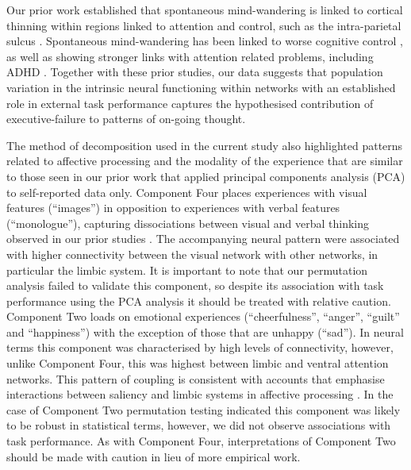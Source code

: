 Our prior work established that spontaneous mind-wandering is linked to cortical thinning within regions linked to attention and control, such as the intra-parietal sulcus \cite{Golchert2017}. 
Spontaneous mind-wandering has been linked to worse cognitive control \cite{Robison2018}, 
as well as showing stronger links with attention related problems, including ADHD \cite{Seli2015}. 
Together with these prior studies, our data suggests that population variation in the intrinsic neural functioning within networks with an established role in external task performance captures the hypothesised contribution of executive-failure to patterns of on-going thought.

The method of decomposition used in the current study also highlighted patterns related to affective processing and the modality of the experience that are similar to those seen in our prior work that applied principal components analysis (PCA) to self-reported data only. Component Four places experiences with visual features (“images”) in opposition to experiences with verbal features (“monologue”), capturing dissociations between visual and verbal thinking observed in our prior studies \cite{Konishi2015,Medea2016,Smallwood2016}. 
The accompanying neural pattern were associated with higher connectivity between the visual network with other networks, in particular the limbic system. It is important to note that our permutation analysis failed to validate this component, so despite its association with task performance using the PCA analysis it should be treated with relative caution. Component Two loads on emotional experiences (“cheerfulness”, “anger”, “guilt” and “happiness”) with the exception of those that are unhappy (“sad”). In neural terms this component was characterised by high levels of connectivity, however, unlike Component Four, this was highest between limbic and ventral attention networks. This pattern of coupling is consistent with accounts that emphasise interactions between saliency and limbic systems in affective processing \cite{Touroutoglou2012}. 
In the case of Component Two permutation testing indicated this component was likely to be robust in statistical terms, however, we did not observe associations with task performance. As with Component Four, interpretations of Component Two should be made with caution in lieu of more empirical work. 

